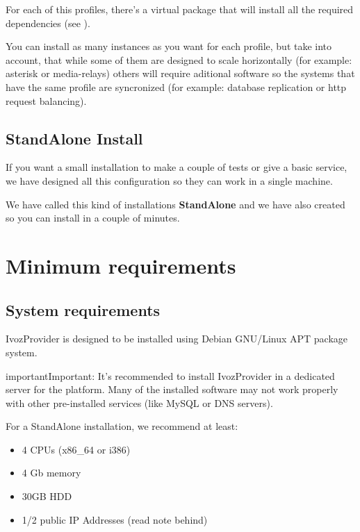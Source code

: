 \documentclass[letterpaper,10pt,english]{sphinxmanual}
\begin{document}
For each of this profiles, there's a virtual package that will install all the
required dependencies (see {\hyperref[basics/installation/debian_install:installing\string-profile\string-package]{}}).

You can install as many instances as you want for each profile, but take into
account, that while some of them are designed to scale horizontally (for
example: asterisk or media-relays) others will require aditional software so the
systems that have the same profile are syncronized (for example: database
replication or http request balancing).


\subsection{StandAlone Install}
\label{basics/installation/install_types:standalone-install}
If you want a small installation to make a couple of tests or give a basic
service, we have designed all this configuration so they can work in a single
machine.

We have called this kind of installations \textbf{StandAlone} and we have also
created {\hyperref[basics/installation/cd_install:automatic\string-iso\string-cd\string-image]{}} so you can install in a couple of minutes.


\section{Minimum requirements}
\label{basics/installation/requirements:minimum-requirements}\label{basics/installation/requirements::doc}

\subsection{System requirements}
\label{basics/installation/requirements:system-requirements}
IvozProvider is designed to be installed using Debian GNU/Linux APT package
system.

\begin{notice}{important}{Important:}
It's recommended to install IvozProvider in a dedicated server
for the platform. Many of the installed software may not work properly with
other pre-installed services (like MySQL or DNS servers).
\end{notice}

For a StandAlone installation, we recommend at least:
\begin{itemize}
\item {} 
4 CPUs (x86\_64 or i386)

\item {} 
4 Gb memory

\item {} 
30GB HDD

\item {} 
1/2 public IP Addresses (read note behind)

\end{itemize}
\end{document}
